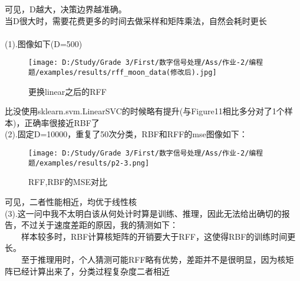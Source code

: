\documentclass[answers]{exam}  %
\begin{document}
\begin{questions}
\begin{figure}[!h]
\end{figure}
可见，D越大，决策边界越准确。\\
当D很大时，需要花费更多的时间去做采样和矩阵乘法，自然会耗时更长\\
\ \\
(1).图像如下(D=500)\\
\begin{figure}[h]
	\centering
	\texttt{[image: D:/Study/Grade 3/First/数字信号处理/Ass/作业-2/编程题/examples/results/rff\_moon\_data(修改后).jpg]}
	\caption{更换linear之后的RFF}
\end{figure}
比没使用sklearn.svm.LinearSVC的时候略有提升(与Figure11相比多分对了1个样本)，正确率很接近RBF了\\
(2).固定D=10000，重复了50次分类，RBF和RFF的mse图像如下：\\
\begin{figure}[h]
	\centering
	\texttt{[image: D:/Study/Grade 3/First/数字信号处理/Ass/作业-2/编程题/examples/results/p2-3.png]}
	\caption{RFF,RBF的MSE对比}
\end{figure}
可见，二者性能相近，均优于线性核\\
(3).这一问中我不太明白该从何处计时算是训练、推理，因此无法给出确切的报告，不过关于速度差距的原因，我的猜测如下：\\
\ \ \ \ 样本较多时，RBF计算核矩阵的开销要大于RFF，这使得RBF的训练时间更长。\\
\ \ \ \ 至于推理用时，个人猜测可能RFF略有优势，差距并不是很明显，因为核矩阵已经计算出来了，分类过程复杂度二者相近


\end{questions}
\end{document}
